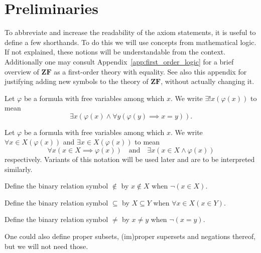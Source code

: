 \documentclass[../main.tex]{subfiles}
\begin{document}
\section{Preliminaries}\label{sec:zermelo_fraenkel_set_theory:preliminaries}
To abbreviate and increase the readability of the axiom statements, it is useful to define a few shorthands. To do this we will use concepts from mathematical logic. If not explained, these notions will be understandable from the context. Additionally one may consult Appendix~\ref{app:first_order_logic} for a brief overview of $\mathbf{ZF}$ as a first-order theory with equality. See also this appendix for justifying adding new symbols to the theory of $\mathbf{ZF}$, without actually changing it.
\begin{definition}
    Let $\varphi$ be a formula with free variables among which $x$. We write $\exists!x(\varphi(x))$ to mean
    \begin{equation*}
        \exists x(\varphi(x)\land\forall y(\varphi(y)\implies x=y)).
    \end{equation*}
\end{definition}
\begin{definition}
    Let $\varphi$ be a formula with free variables among which $x$. We write $\forall x\in X(\varphi(x))$ and $\exists x\in X(\varphi(x))$ to mean
    \begin{equation*}
        \forall x(x\in X\implies\varphi(x))\quad\text{and}\quad\exists x(x\in X\land\varphi(x))
    \end{equation*}
    respectively. Variants of this notation will be used later and are to be interpreted similarly.
\end{definition}
\begin{definition}
    Define the binary relation symbol $\notin$ by $x\notin X$ when $\lnot(x\in X)$.
\end{definition}
\begin{definition}
    Define the binary relation symbol $\subseteq$ by $X\subseteq Y$ when $\forall x\in X(x\in Y)$.
\end{definition}
\begin{definition}
    Define the binary relation symbol $\neq$ by $x\neq y$ when $\lnot(x=y)$.
\end{definition}
One could also define proper subsets, (im)proper supersets and negations thereof, but we will not need those.
\end{document}
